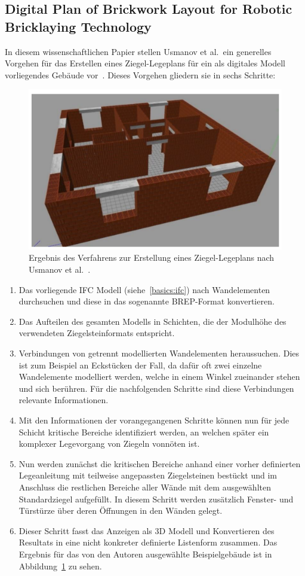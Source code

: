 \subsection{Digital Plan of Brickwork Layout for Robotic Bricklaying Technology}\label{related:digital_plan_of_brickwork_layout}
In diesem wissenschaftlichen Papier stellen Usmanov et al.\ ein generelles Vorgehen für das Erstellen eines Ziegel-Legeplans für ein als digitales Modell vorliegendes Gebäude vor~\cite{Usmanov2021}.
Dieses Vorgehen gliedern sie in sechs Schritte:
\begin{figure}[h!]
    \centering
    \includegraphics[width=0.5\columnwidth]{fig/sustainability1303905g004.png}
    \caption{Ergebnis des Verfahrens zur Erstellung eines Ziegel-Legeplans nach Usmanov et al.~\cite{Usmanov2021}.}\label{fig:related:usmanov}
\end{figure}
\begin{enumerate}
\item Das vorliegende IFC Modell (siehe~\ref{basics:ifc}) nach Wandelementen durchsuchen und diese in das sogenannte BREP-Format konvertieren.
\item Das Aufteilen des gesamten Modells in Schichten, die der Modulhöhe des verwendeten Ziegelsteinformats entspricht.
\item Verbindungen von getrennt modellierten Wandelementen heraussuchen. 
Dies ist zum Beispiel an Eckstücken der Fall, da dafür oft zwei einzelne Wandelemente modelliert werden, welche in einem Winkel zueinander stehen und sich berühren. 
Für die nachfolgenden Schritte sind diese Verbindungen relevante Informationen.
\item Mit den Informationen der vorangegangenen Schritte können nun für jede Schicht kritische Bereiche identifiziert werden, an welchen später ein komplexer Legevorgang von Ziegeln vonnöten ist.
\item Nun werden zunächst die kritischen Bereiche anhand einer vorher definierten Legeanleitung mit teilweise angepassten Ziegelsteinen bestückt und im Anschluss die restlichen Bereiche aller Wände mit dem ausgewählten Standardziegel aufgefüllt. 
In diesem Schritt werden zusätzlich Fenster- und Türstürze über deren Öffnungen in den Wänden gelegt.
\item Dieser Schritt fasst das Anzeigen als 3D Modell und Konvertieren des Resultats in eine nicht konkreter definierte Listenform zusammen. 
Das Ergebnis für das von den Autoren ausgewählte Beispielgebäude ist in Abbildung~\ref{fig:related:usmanov} zu sehen. 
\end{enumerate}

